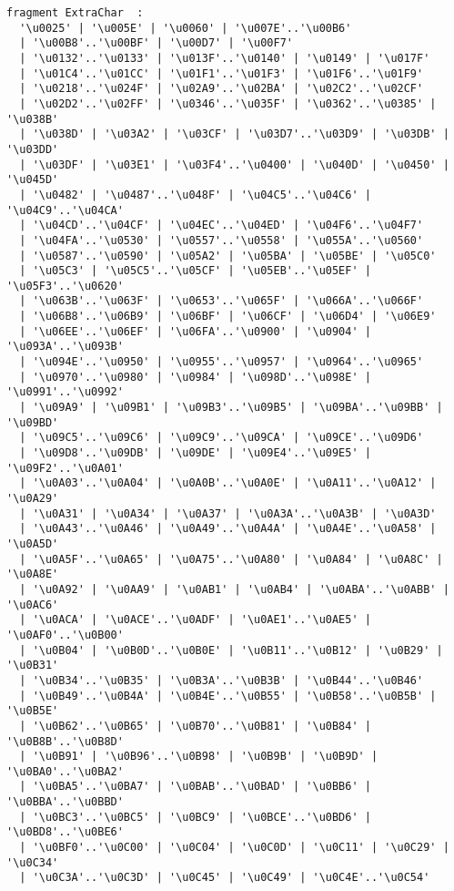 \begin{Verbatim}[frame=none, fontsize=\footnotesize]
fragment ExtraChar  : 
  '\u0025' | '\u005E' | '\u0060' | '\u007E'..'\u00B6' 
  | '\u00B8'..'\u00BF' | '\u00D7' | '\u00F7' 
  | '\u0132'..'\u0133' | '\u013F'..'\u0140' | '\u0149' | '\u017F' 
  | '\u01C4'..'\u01CC' | '\u01F1'..'\u01F3' | '\u01F6'..'\u01F9' 
  | '\u0218'..'\u024F' | '\u02A9'..'\u02BA' | '\u02C2'..'\u02CF' 
  | '\u02D2'..'\u02FF' | '\u0346'..'\u035F' | '\u0362'..'\u0385' | '\u038B' 
  | '\u038D' | '\u03A2' | '\u03CF' | '\u03D7'..'\u03D9' | '\u03DB' | '\u03DD' 
  | '\u03DF' | '\u03E1' | '\u03F4'..'\u0400' | '\u040D' | '\u0450' | '\u045D' 
  | '\u0482' | '\u0487'..'\u048F' | '\u04C5'..'\u04C6' | '\u04C9'..'\u04CA' 
  | '\u04CD'..'\u04CF' | '\u04EC'..'\u04ED' | '\u04F6'..'\u04F7' 
  | '\u04FA'..'\u0530' | '\u0557'..'\u0558' | '\u055A'..'\u0560' 
  | '\u0587'..'\u0590' | '\u05A2' | '\u05BA' | '\u05BE' | '\u05C0' 
  | '\u05C3' | '\u05C5'..'\u05CF' | '\u05EB'..'\u05EF' | '\u05F3'..'\u0620' 
  | '\u063B'..'\u063F' | '\u0653'..'\u065F' | '\u066A'..'\u066F' 
  | '\u06B8'..'\u06B9' | '\u06BF' | '\u06CF' | '\u06D4' | '\u06E9' 
  | '\u06EE'..'\u06EF' | '\u06FA'..'\u0900' | '\u0904' | '\u093A'..'\u093B' 
  | '\u094E'..'\u0950' | '\u0955'..'\u0957' | '\u0964'..'\u0965' 
  | '\u0970'..'\u0980' | '\u0984' | '\u098D'..'\u098E' | '\u0991'..'\u0992' 
  | '\u09A9' | '\u09B1' | '\u09B3'..'\u09B5' | '\u09BA'..'\u09BB' | '\u09BD' 
  | '\u09C5'..'\u09C6' | '\u09C9'..'\u09CA' | '\u09CE'..'\u09D6' 
  | '\u09D8'..'\u09DB' | '\u09DE' | '\u09E4'..'\u09E5' | '\u09F2'..'\u0A01' 
  | '\u0A03'..'\u0A04' | '\u0A0B'..'\u0A0E' | '\u0A11'..'\u0A12' | '\u0A29' 
  | '\u0A31' | '\u0A34' | '\u0A37' | '\u0A3A'..'\u0A3B' | '\u0A3D' 
  | '\u0A43'..'\u0A46' | '\u0A49'..'\u0A4A' | '\u0A4E'..'\u0A58' | '\u0A5D' 
  | '\u0A5F'..'\u0A65' | '\u0A75'..'\u0A80' | '\u0A84' | '\u0A8C' | '\u0A8E' 
  | '\u0A92' | '\u0AA9' | '\u0AB1' | '\u0AB4' | '\u0ABA'..'\u0ABB' | '\u0AC6' 
  | '\u0ACA' | '\u0ACE'..'\u0ADF' | '\u0AE1'..'\u0AE5' | '\u0AF0'..'\u0B00' 
  | '\u0B04' | '\u0B0D'..'\u0B0E' | '\u0B11'..'\u0B12' | '\u0B29' | '\u0B31' 
  | '\u0B34'..'\u0B35' | '\u0B3A'..'\u0B3B' | '\u0B44'..'\u0B46' 
  | '\u0B49'..'\u0B4A' | '\u0B4E'..'\u0B55' | '\u0B58'..'\u0B5B' | '\u0B5E' 
  | '\u0B62'..'\u0B65' | '\u0B70'..'\u0B81' | '\u0B84' | '\u0B8B'..'\u0B8D' 
  | '\u0B91' | '\u0B96'..'\u0B98' | '\u0B9B' | '\u0B9D' | '\u0BA0'..'\u0BA2' 
  | '\u0BA5'..'\u0BA7' | '\u0BAB'..'\u0BAD' | '\u0BB6' | '\u0BBA'..'\u0BBD' 
  | '\u0BC3'..'\u0BC5' | '\u0BC9' | '\u0BCE'..'\u0BD6' | '\u0BD8'..'\u0BE6' 
  | '\u0BF0'..'\u0C00' | '\u0C04' | '\u0C0D' | '\u0C11' | '\u0C29' | '\u0C34' 
  | '\u0C3A'..'\u0C3D' | '\u0C45' | '\u0C49' | '\u0C4E'..'\u0C54' 

\end{Verbatim}

